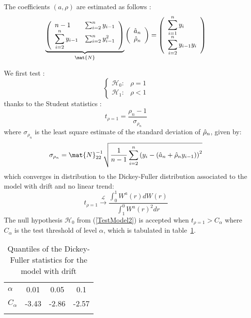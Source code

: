The coefficients $(a,\rho)$ are estimated as follows :
\begin{equation}\label{Model2Estim}
  \underbrace{\left(\begin{array}{lll}
      \displaystyle n-1  &\sum_{i=2}^n y_{i-1}\\
      \displaystyle \sum_{i=2}^n y_{i-1} &\sum_{i=2}^n y_{i-1}^2
    \end{array}
    \right)}_{\mat{N}}
  \left(\begin{array}{c}
    \hat{a}_n\\
    \hat{\rho}_n
  \end{array}
  \right)=
  \left(
  \begin{array}{l}
    \displaystyle \sum_{i=1}^n y_{i} \\
    \displaystyle \sum_{i=2}^n y_{i-1} y_{i}
  \end{array}
  \right)
\end{equation}


We first test :
\begin{equation}\label{TestModel2}
  \left\{
  \begin{array}{lr}
    \mathcal{H}_0 :  & \rho = 1 \\
    \mathcal{H}_1 : & \rho < 1
  \end{array}
  \right.
\end{equation}
thanks to the Student statistics :
\begin{equation}\label{stdtStat}
  t_{\rho=1} = \frac{\rho_n-1}{\sigma_{\rho_n}}
\end{equation}
where $\sigma_{\rho_n}$ is the least square estimate of the standard deviation of $\Hat{\rho}_n$, given by:
\begin{equation}
  \sigma_{\rho_n}=\mat{N}^{-1}_{22}\sqrt{\frac{1}{n-1}\sum_{i=2}^n\left(y_{i}-(\hat{a}_n+\hat{\rho}_ny_{i-1})\right)^2}
\end{equation}
which converges in distribution to the Dickey-Fuller distribution associated to the model with drift and no linear trend:
\begin{equation}
  t_{\rho = 1} \stackrel{\mathcal{L}}{\longrightarrow} \frac{\int_{0}^{1}W^{a}(r) dW(r)}{\int_{1}^{0} W^{a}(r)^2 dr}
\end{equation}
The null hypothesis $\mathcal{H}_0$ from (\ref{TestModel2}) is accepted when $t_{\rho=1} > C_{\alpha}$ where $C_{\alpha}$ is the test threshold of level $\alpha$, which is tabulated in table~\ref{DickeyFullerPval2}.\\

\begin{table}
  \centering
  \begin{tabular}{lccc}
    \hline\noalign{\smallskip}
    $\alpha$ & 0.01 & 0.05 & 0.1 \\
    \noalign{\smallskip}\hline\noalign{\smallskip}
    $C_{\alpha}$ & -3.43 & -2.86 & -2.57 \\
    \noalign{\smallskip}\hline
  \end{tabular}
  \caption{Quantiles of the Dickey-Fuller statistics for the model with drift}\label{DickeyFullerPval2}
\end{table}

